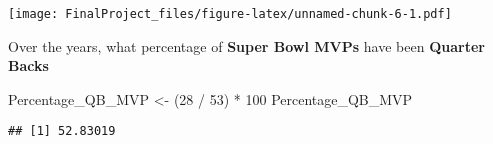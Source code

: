 \documentclass[
]{article}
\newenvironment{Shaded}{\begin{snugshade}}{\end{snugshade}}
\newcommand{\DecValTok}[1]{\textcolor[rgb]{0.00,0.00,0.81}{#1}}
\newcommand{\NormalTok}[1]{#1}
\newcommand{\OtherTok}[1]{\textcolor[rgb]{0.56,0.35,0.01}{#1}}
\newcommand{\SpecialCharTok}[1]{\textcolor[rgb]{0.00,0.00,0.00}{#1}}
\begin{document}
\texttt{[image: FinalProject\_files/figure-latex/unnamed-chunk-6-1.pdf]}

Over the years, what percentage of \textbf{Super Bowl MVPs} have been
\textbf{Quarter Backs}

\begin{Shaded}
\begin{Highlighting}[]
\NormalTok{Percentage\_QB\_MVP }\OtherTok{\textless{}{-}}\NormalTok{ (}\DecValTok{28} \SpecialCharTok{/} \DecValTok{53}\NormalTok{) }\SpecialCharTok{*} \DecValTok{100}
\NormalTok{Percentage\_QB\_MVP}
\end{Highlighting}
\end{Shaded}

\begin{verbatim}
## [1] 52.83019
\end{verbatim}
\end{document}
